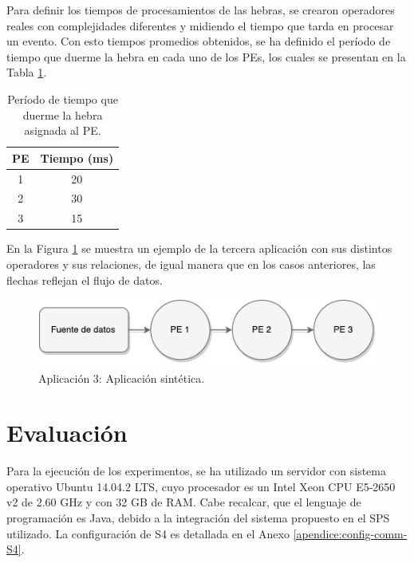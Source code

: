 Para definir los tiempos de procesamientos de las hebras, se crearon operadores reales con complejidades diferentes y midiendo el tiempo que tarda en procesar un evento. Con esto tiempos promedios obtenidos, se ha definido el período de tiempo que duerme la hebra en cada uno de los PEs, los cuales se presentan en la Tabla \ref{tab:app3-time}.


\begin{table}[!ht]
\centering
\caption{Período de tiempo que duerme la hebra asignada al PE.}
\begin{tabular}{| c | c |}
\hline
PE & Tiempo (ms) \\ \hline
1 & 20 \\
2 & 30 \\
3 & 15 \\\hline
\end{tabular}
\label{tab:app3-time}
\end{table}

En la Figura \ref{fig:terceraAplicacion} se muestra un ejemplo de la tercera aplicación con sus distintos operadores y sus relaciones, de igual manera que en los casos anteriores, las flechas reflejan el flujo de datos.

\begin{figure}[!ht]
	\centering
		\includegraphics[scale=0.6]{images/App3.pdf}
	\caption{Aplicación 3: Aplicación sintética.}
	\label{fig:terceraAplicacion}
\end{figure}

\section{Evaluación}
Para la ejecución de los experimentos, se ha utilizado un servidor con sistema operativo Ubuntu 14.04.2 LTS, cuyo procesador es un Intel Xeon CPU E5-2650 v2 de 2.60 GHz y con 32 GB de RAM. Cabe recalcar, que el lenguaje de programación es Java, debido a la integración del sistema propuesto en el SPS utilizado. La configuración de S4 es detallada en el Anexo \ref{apendice:config-comm-S4}.

